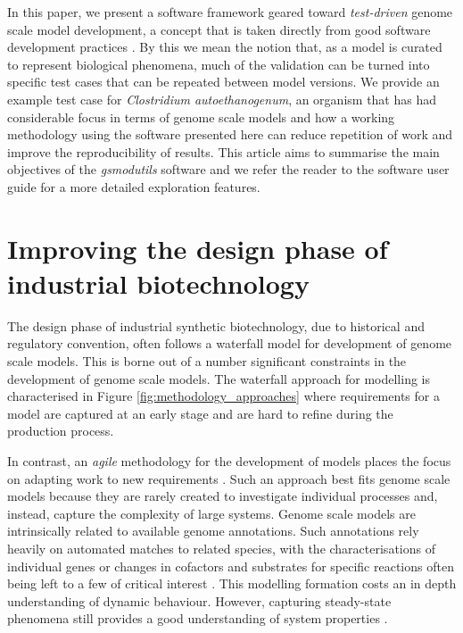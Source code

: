 \documentclass[journal=asbcd6,10pt]{achemso}
\begin{document}
In this paper, we present a software framework geared toward \textit{test-driven} genome scale model development, a concept that is taken directly from good software development practices \cite{martin2002agile}.
By this we mean the notion that, as a model is curated to represent biological phenomena, much of the validation can be turned into specific test cases that can be repeated between model versions.
We provide an example test case for \textit{Clostridium autoethanogenum}, an organism that has had considerable focus in terms of genome scale models and how a working methodology using the software presented here can reduce repetition of work and improve the reproducibility of results.
This article aims to summarise the main objectives of the \textit{gsmodutils} software and we refer the reader to the software user guide for a more detailed exploration features.

\section{Improving the design phase of industrial biotechnology}

The design phase of industrial synthetic biotechnology, due to historical and regulatory convention, often follows a waterfall model for development of genome scale models.
This is borne out of a number significant constraints in the development of genome scale models.
The waterfall approach for modelling is characterised in Figure \ref{fig:methodology_approaches} where requirements for a model are captured at an early stage and are hard to refine during the production process.

In contrast, an \textit{agile} methodology for the development of models places the focus on adapting work to new requirements \cite{martin2002agile}.
Such an approach best fits genome scale models because they are rarely created to investigate individual processes and, instead, capture the complexity of large systems.
Genome scale models are intrinsically related to available genome annotations.
Such annotations rely heavily on automated matches to related species, with the characterisations of individual genes or changes in cofactors and substrates for specific reactions often being left to a few of critical interest \cite{seemann2014prokka}.
This modelling formation costs an in depth understanding of dynamic behaviour. 
However, capturing steady-state phenomena still provides a good understanding of system properties \cite{o2015using}.
\end{document}
